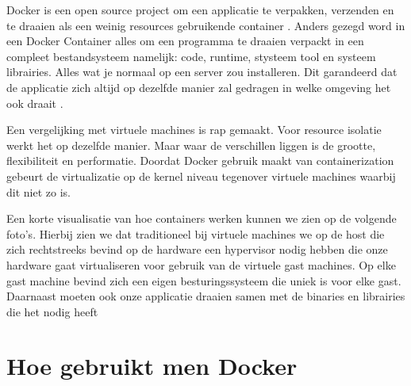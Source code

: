 Docker is een open source project om een applicatie te verpakken, verzenden en te draaien als een weinig resources gebruikende container \cite{Docker:TheContainerEngine2016}. Anders gezegd word in een Docker Container alles om een programma te draaien verpackt in een compleet bestandsysteem namelijk: code, runtime, stysteem tool en systeem librairies. Alles wat je normaal op een server zou installeren. Dit garandeerd dat de applicatie zich altijd op dezelfde manier zal gedragen in welke omgeving het ook draait \citep{WatIsDocker2016}.

Een vergelijking met virtuele machines is rap gemaakt. Voor resource isolatie werkt het op dezelfde manier. Maar waar de verschillen liggen is de grootte, flexibiliteit en performatie. Doordat Docker gebruik maakt van containerization gebeurt de virtualizatie op de kernel niveau tegenover virtuele machines waarbij dit niet zo is. 

Een korte visualisatie van hoe containers werken kunnen we zien op de volgende foto's. Hierbij zien we dat traditioneel bij virtuele machines we op de host die zich rechtstreeks bevind op de hardware een hypervisor nodig hebben die onze hardware gaat virtualiseren voor gebruik van de virtuele gast machines. Op elke gast machine bevind zich een eigen besturingssysteem die uniek is voor elke gast. Daarnaast moeten ook onze applicatie draaien samen met de binaries en librairies die het nodig heeft 

\section{Hoe gebruikt men Docker}
